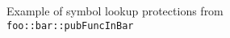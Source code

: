 \begin{figure}[H]
{\begin{tikzpicture}
    \end{tikzpicture}
  }
  \caption{\label{fig:symbol_privacy} Example of symbol lookup protections from \texttt{foo::bar::pubFuncInBar}}
\end{figure}
